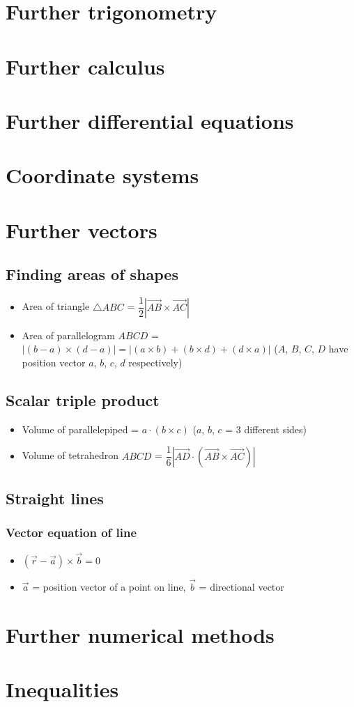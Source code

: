 \documentclass[11pt, A4paper]{article}
\begin{document}
	\section{Further trigonometry}
	
	
	
	\section{Further calculus}
	\section{Further differential equations}
	\section{Coordinate systems}
	\section{Further vectors}
	\subsection{Finding areas of shapes}
	\begin{itemize}
		\item Area of triangle $\bigtriangleup ABC$ = $\dfrac{1}{2}|\overrightarrow{AB}\times\overrightarrow{AC}|$
		\item Area of parallelogram $ABCD$ = $|(b-a) \times (d-a)|=|(a\times b)+(b \times d) + (d \times a)|$ ($A$, $B$, $C$, $D$ have position vector $a$, $b$, $c$, $d$ respectively)
	\end{itemize}
	\subsection{Scalar triple product}
	\begin{itemize}
		\item Volume of parallelepiped = $a\cdot(b\times c)$ ($a$, $b$, $c$ = 3 different sides)
		\item Volume of tetrahedron $ABCD$ = $\dfrac{1}{6}|\overrightarrow{AD}\cdot(\overrightarrow{AB}\times\overrightarrow{AC})|$
	\end{itemize}
	\subsection{Straight lines}
	\subsubsection{Vector equation of line}
	\begin{itemize}
		\item $(\vec{r}-\vec{a})\times\vec{b}=0$
		\item $\vec{a}$ = position vector of a point on line, $\vec{b}$ = directional vector
	\end{itemize}
	
	
	\section{Further numerical methods}
	\section{Inequalities}
\end{document}
